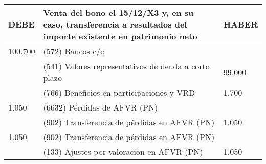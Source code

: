 \begin{enumerate}[label=\textbf{\alph*})]
        \begin{table}[H]
            \centering
            \begin{tabular}{|p{3cm}|p{6cm}|p{3cm}|}
            \hline
            \rowcolor{blue!30}
            \textbf{DEBE} & \textbf{Venta del bono el 15/12/X3 y, en su caso, transferencia a resultados del importe existente en patrimonio neto} & \textbf{HABER} \\
            \hline
            100.700 & (572) Bancos c/c & \\
            \hline
            & (541) Valores representativos de deuda a corto plazo & 99.000 \\
            \hline
            & (766) Beneficios en participaciones y VRD & 1.700 \\
            \hline
            1.050 & (6632) Pérdidas de AFVR (PN) & \\
            \hline
            & (902) Transferencia de pérdidas en AFVR (PN) & 1.050 \\
            \hline
            1.050 & (902) Transferencia de pérdidas en AFVR (PN) & \\
            \hline
            & (133) Ajustes por valoración en AFVR (PN) & 1.050 \\
            \hline
            \end{tabular}
        \end{table}
        

    \end{enumerate}

    
    







